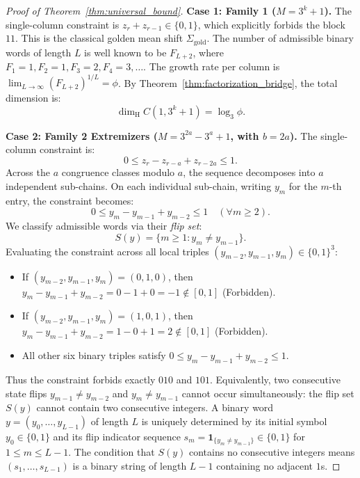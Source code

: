 \documentclass[11pt,reqno]{amsart}
\theoremstyle{plain}
\theoremstyle{definition}
\theoremstyle{remark}
\newcommand{\dimH}{\dim_{\mathrm{H}}}
\begin{document}
\begin{proof}[Proof of Theorem~\ref{thm:universal_bound}]
\textbf{Case 1: Family 1 ($M = 3^k + 1$).}
The single-column constraint is $z_r + z_{r-1} \in \{0, 1\}$, which explicitly forbids the block $11$. This is the classical golden mean shift $\Sigma_{\mathrm{gold}}$. The number of admissible binary words of length $L$ is well known to be $F_{L+2}$, where $F_1 = 1, F_2 = 1, F_3 = 2, F_4 = 3, \dots$. The growth rate per column is $\lim_{L \to \infty} (F_{L+2})^{1/L} = \phi$. By Theorem~\ref{thm:factorization_bridge}, the total dimension is:
\begin{equation}
\dimH C(1, 3^k + 1) = \log_3 \phi.
\end{equation}

\textbf{Case 2: Family 2 Extremizers ($M = 3^{2a} - 3^a + 1$, with $b = 2a$).}
The single-column constraint is:
\begin{equation}\label{eq:f2_extremizer}
0 \le z_r - z_{r-a} + z_{r-2a} \le 1.
\end{equation}
Across the $a$ congruence classes modulo $a$, the sequence decomposes into $a$ independent sub-chains. On each individual sub-chain, writing $y_m$ for the $m$-th entry, the constraint becomes:
\begin{equation}
0 \le y_m - y_{m-1} + y_{m-2} \le 1 \quad (\forall m \ge 2).
\end{equation}
We classify admissible words via their \emph{flip set}:
\begin{equation}
S(y) = \{ m \ge 1 : y_m \ne y_{m-1} \}.
\end{equation}
Evaluating the constraint across all local triples $(y_{m-2}, y_{m-1}, y_m) \in \{0, 1\}^3$:
\begin{itemize}
    \item If $(y_{m-2}, y_{m-1}, y_m) = (0, 1, 0)$, then $y_m - y_{m-1} + y_{m-2} = 0 - 1 + 0 = -1 \notin [0, 1]$ (Forbidden).
    \item If $(y_{m-2}, y_{m-1}, y_m) = (1, 0, 1)$, then $y_m - y_{m-1} + y_{m-2} = 1 - 0 + 1 = 2 \notin [0, 1]$ (Forbidden).
    \item All other six binary triples satisfy $0 \le y_m - y_{m-1} + y_{m-2} \le 1$.
\end{itemize}
Thus the constraint forbids exactly $010$ and $101$. Equivalently, two consecutive state flips $y_{m-1} \ne y_{m-2}$ and $y_m \ne y_{m-1}$ cannot occur simultaneously: the flip set $S(y)$ cannot contain two consecutive integers.
A binary word $y = (y_0, \dots, y_{L-1})$ of length $L$ is uniquely determined by its initial symbol $y_0 \in \{0, 1\}$ and its flip indicator sequence $s_m = \mathbf{1}_{\{y_m \ne y_{m-1}\}} \in \{0, 1\}$ for $1 \le m \le L-1$. The condition that $S(y)$ contains no consecutive integers means $(s_1, \dots, s_{L-1})$ is a binary string of length $L-1$ containing no adjacent $1$s.

\end{proof}
\end{document}
